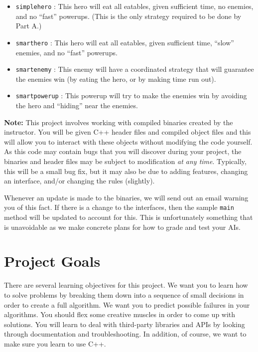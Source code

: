 \documentclass[11pt]{article}
\begin{document}
\begin{itemize}
\item \texttt{simplehero} : This hero will eat all eatables, given sufficient time, no enemies, and no ``fast'' powerups.  (This is the only strategy required to be done by Part A.)
\item \texttt{smarthero} : This hero will eat all eatables, given sufficient time, ``slow'' enemies, and no ``fast'' powerups.
\item \texttt{smartenemy} : This enemy will have a coordinated strategy that will guarantee the enemies win (by eating the hero, or by making time run out).
\item \texttt{smartpowerup} : This powerup will try to make the enemies win by avoiding the hero and ``hiding'' near the enemies.
\end{itemize}

\textbf{Note:} This project involves working with compiled binaries created by the instructor. 
You will be given C++ header files and compiled object files and this will allow you to interact with these objects without modifying the code yourself.
As this code may contain bugs that you will discover during your project, the binaries and header files may be subject to modification \emph{at any time}.
Typically, this will be a small bug fix, but it may also be due to adding features, changing an interface, and/or changing the rules (slightly).

Whenever an update is made to the binaries, we will send out an email warning you of this fact.
If there is a change to the interfaces, then the sample \texttt{main} method will be updated to account for this.
This is unfortunately something that is unavoidable as we make concrete plans for how to grade and test your AIs.

\section{Project Goals}

There are several learning objectives for this project. 
We want you to learn how to solve problems by breaking them down into a sequence of small decisions in order to create a full algorithm.
We want you to predict possible failures in your algorithms.
You should flex some creative muscles in order to come up with solutions.
You will learn to deal with third-party libraries and APIs by looking through documentation and troubleshooting.
In addition, of course, we want to make sure you learn to use C++.
\end{document}
